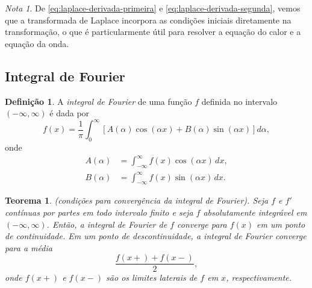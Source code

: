 \documentclass{article}
\theoremstyle{plain}
\newtheorem{thm}{Teorema}[section]
\theoremstyle{definition}
\newtheorem{defn}{Definição}[section]
\theoremstyle{remark}
\newtheorem*{rem}{Nota}
\begin{document}
\begin{rem}
    De \eqref{eq:laplace-derivada-primeira} e \eqref{eq:laplace-derivada-segunda}, vemos que a transformada de Laplace incorpora as condições iniciais diretamente na transformação, o que é particularmente útil para resolver a equação do calor e a equação da onda.
\end{rem}

\subsection{Integral de Fourier}

\begin{defn}
    A \emph{integral de Fourier} de uma função \(f\) definida no intervalo \(\left(-\infty, \infty\right)\) é dada por
    \begin{equation}\label{eq:integral-fourier}
        f(x) = \frac{1}{\pi} \int_{0}^{\infty} \left[A(\alpha) \cos(\alpha x) + B(\alpha) \sin(\alpha x)\right] d\alpha,
    \end{equation}
    \noindent onde
    \begin{align}
        A(\alpha) &= \int_{-\infty}^{\infty} f(x) \cos(\alpha x) \, dx, \\
        B(\alpha) &= \int_{-\infty}^{\infty} f(x) \sin(\alpha x) \, dx.
    \end{align}
\end{defn}

\begin{thm} (condições para convergência da integral de Fourier).
    Seja \(f\) e \(f'\) contínuas por partes em todo intervalo finito e seja \(f\) absolutamente integrável em \((-\infty, \infty)\). Então, a integral de Fourier de \(f\) converge para \(f(x)\) em um ponto de continuidade. Em um ponto de descontinuidade, a integral de Fourier converge para a média
    \begin{equation}
        \frac{f(x+) + f(x-)}{2},
    \end{equation}
    \noindent onde \(f(x+)\) e \(f(x-)\) são os limites laterais de \(f\) em \(x\), respectivamente.
\end{thm}
\end{document}
